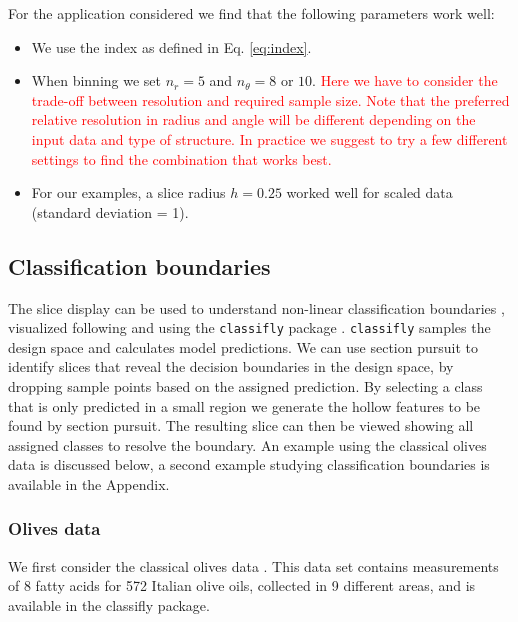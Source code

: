 \documentclass[]{interact}
\theoremstyle{plain}%
\theoremstyle{definition}
\theoremstyle{remark}
\def\tightlist{}
\begin{document}
For the application considered we find that the following parameters
work well:

\begin{itemize}
\tightlist
\item
  We use the index as defined in Eq. \ref{eq:index}.
\item
  When binning we set \(n_r=5\) and \(n_{\theta}=8\) or \(10\).
  \textcolor{red}{Here we have to consider the trade-off between resolution and required sample size. Note that the preferred relative resolution in radius and angle will be different depending on the input data and type of structure. In practice we suggest to try a few different settings to find the combination that works best.}
\item
  For our examples, a slice radius \(h=0.25\) worked well for scaled
  data (standard deviation = 1).
\end{itemize}

\hypertarget{classification-boundaries}{%
\subsection{Classification boundaries}\label{classification-boundaries}}

The slice display can be used to understand non-linear classification
boundaries \citep{laa2019slice}, visualized following \citet{sam.11271}
and using the \texttt{classifly} package \citep{classifly}.
\texttt{classifly} samples the design space and calculates model
predictions. We can use section pursuit to identify slices that reveal
the decision boundaries in the design space, by dropping sample points
based on the assigned prediction. By selecting a class that is only
predicted in a small region we generate the hollow features to be found
by section pursuit. The resulting slice can then be viewed showing all
assigned classes to resolve the boundary. An example using the classical
olives data is discussed below, a second example studying classification
boundaries is available in the Appendix.

\hypertarget{sec:olives}{%
\subsubsection*{Olives data}\label{sec:olives}}

We first consider the classical olives data \citep{olives}. This data
set contains measurements of 8 fatty acids for 572 Italian olive oils,
collected in 9 different areas, and is available in the classifly
package.
\end{document}
